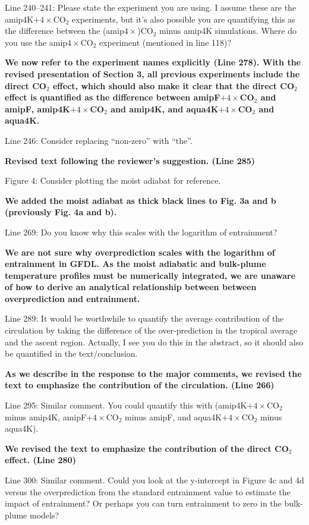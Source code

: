 \documentclass[11pt]{article}
\begin{document}
Line 240--241: Please state the experiment you are using. I assume these are the amip4K\(+4\times\)CO\(_2\) experiments, but it's also possible you are quantifying this as the difference between the (amip\(4\times\))CO\(_2\) minus amip4K simulations. Where do you use the amip\(4\times\)CO\(_2\) experiment (mentioned in line 118)?

\textbf{We now refer to the experiment names explicitly (Line 278). With the revised presentation of Section 3, all previous experiments include the direct CO\(_2\) effect, which should also make it clear that the direct CO\(_2\) effect is quantified as the difference between amipF\(+4\times\)CO\(_2\) and amipF, amip4K\(+4\times\)CO\(_2\) and amip4K, and aqua4K\(+4\times\)CO\(_2\) and aqua4K.}

Line 246: Consider replacing ``non-zero'' with ``the''.

\textbf{Revised text following the reviewer's suggestion. (Line 285)}

Figure 4: Consider plotting the moist adiabat for reference.

\textbf{We added the moist adiabat as thick black lines to Fig. 3a and b (previously Fig. 4a and b).}

Line 269: Do you know why this scales with the logarithm of entrainment?

\textbf{We are not sure why overprediction scales with the logarithm of entrainment in GFDL. As the moist adiabatic and bulk-plume temperature profiles must be numerically integrated, we are unaware of how to derive an analytical relationship between between overprediction and entrainment.}

Line 289: It would be worthwhile to quantify the average contribution of the circulation by taking the difference of the over-prediction in the tropical average and the ascent region. Actually, I see you do this in the abstract, so it should also be quantified in the text/conclusion.

\textbf{As we describe in the response to the major comments, we revised the text to emphasize the contribution of the circulation. (Line 266)}

Line 295: Similar comment. You could quantify this with (amip4K\(+4\times\)CO\(_2\) minus amip4K, amipF\(+4\times\)CO\(_2\) minus amipF, and aqua4K\(+4\times\)CO\(_2\) minus aqua4K).

\textbf{We revised the text to emphasize the contribution of the direct CO\(_2\) effect. (Line 280)}

Line 300: Similar comment. Could you look at the y-intercept in Figure 4c and 4d versus the overprediction from the standard entrainment value to estimate the impact of entrainment? Or perhaps you can turn entrainment to zero in the bulk-plume models?
\end{document}
